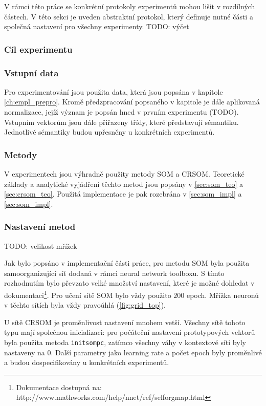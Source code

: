 \documentclass[thesis=M,czech]{FITthesis}[2012/06/26]
\begin{document}
V rámci této práce se konkrétní protokoly experimentů mohou lišit v rozdílných částech. V této sekci je uveden abstraktní protokol, který definuje nutné části a společná nastavení pro všechny experimenty. TODO: výčet

\subsubsection*{Cíl experimentu}


\subsubsection*{Vstupní data}
Pro experimentování jsou použita data, která jsou popsána v kapitole \ref{ch:empl_prepro}. Kromě předzpracování popsaného v kapitole je dále aplikovaná normalizace, jejíž význam je popsán hned v prvním experimentu (TODO).
Vstupním vektorům jsou dále přiřazeny třídy, které představují sémantiku. Jednotlivé sémantiky budou upřesněny u konkrétních experimentů.


\subsubsection*{Metody}
V experimentech jsou výhradně použity metody SOM a CRSOM. Teoretické základy a analytické vyjádření těchto metod jsou popsány v \ref{sec:som_teo} a \ref{sec:crsom_teo}. Použitá implementace je pak rozebrána v \ref{sec:som_impl} a \ref{sec:som_impl}. 



\subsubsection*{Nastavení metod}

TODO: velikost mřížek

Jak bylo popsáno v implementační části práce, pro metodu SOM byla použita samoorganizující síť dodaná v rámci neural network toolboxu. S tímto rozhodnutím bylo převzato velké množství nastavení, které je možné dohledat v dokumentaci\footnote{Dokumentace dostupná na: http://www.mathworks.com/help/nnet/ref/selforgmap.html}. Pro učení sítě SOM bylo vždy použito $200$ epoch. Mřížka neuronů v těchto sítích byla vždy pravoúhlá (\ref{fig:grid_top}).

U sítě CRSOM je proměnlivost nastavení mnohem vetší. Všechny sítě tohoto typu mají společnou inicializaci: pro počáteční nastavení prototypových vektorů byla použita metoda \texttt{initsompc}, zatímco všechny váhy v kontextové síti byly nastaveny na $0$. Další parametry jako learning rate a počet epoch byly proměnlivé a budou dospecifikovány u konkrétních experimentů.
\end{document}
